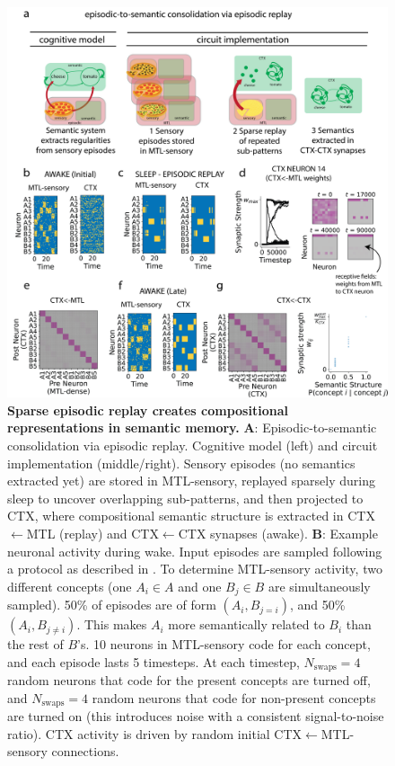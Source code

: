\documentclass{article}
\begin{document}
\begin{figure}
    \centering
    \includegraphics[width=\linewidth]{Figures/Figure_2.png}
\caption{\textbf{Sparse episodic replay creates compositional representations in semantic memory.} \textbf{A}: Episodic-to-semantic consolidation via episodic replay. Cognitive model (left) and circuit implementation (middle/right). Sensory episodes (no semantics extracted yet) are stored in MTL-sensory, replayed sparsely during sleep to uncover overlapping sub-patterns, and then projected to CTX, where compositional semantic structure is extracted in CTX$\leftarrow$MTL (replay) and CTX$\leftarrow$CTX synapses (awake).  
\textbf{B}: Example neuronal activity during wake. Input episodes are sampled following a protocol as described in . To determine MTL-sensory activity, two different concepts (one $A_i \in A$ and one $B_j \in B$ are simultaneously sampled). 50\% of episodes are of form $(A_i, B_{j=i})$, and 50\% $(A_i, B_{j\neq i})$. This makes $A_i$ more semantically related to $B_i$ than the rest of $B$'s. 10 neurons in MTL-sensory code for each concept, and each episode lasts 5 timesteps. At each timestep, $N_\textrm{swaps}= 4$ random neurons that code for the present concepts are turned off, and  $N_\textrm{swaps}= 4$ random neurons that code for non-present concepts are turned on (this introduces noise with a consistent signal-to-noise ratio). CTX activity is driven by random initial CTX$\leftarrow$MTL-sensory connections.
}
\end{figure}
\end{document}
